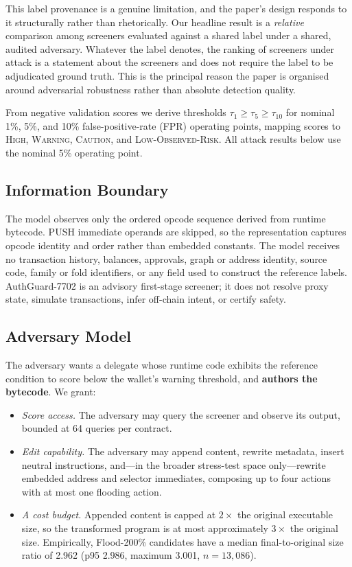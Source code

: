 \documentclass[conference]{IEEEtran}
\begin{document}
This label provenance is a genuine limitation, and the paper's design responds to it structurally rather than rhetorically. Our headline result is a \emph{relative} comparison among screeners evaluated against a shared label under a shared, audited adversary. Whatever the label denotes, the ranking of screeners under attack is a statement about the screeners and does not require the label to be adjudicated ground truth. This is the principal reason the paper is organised around adversarial robustness rather than absolute detection quality.

From negative validation scores we derive thresholds $\tau_1\geq\tau_5\geq\tau_{10}$ for nominal 1\%, 5\%, and 10\% false-positive-rate (FPR) operating points, mapping scores to \textsc{High}, \textsc{Warning}, \textsc{Caution}, and \textsc{Low-Observed-Risk}. All attack results below use the nominal 5\% operating point.

\subsection{Information Boundary}

The model observes only the ordered opcode sequence derived from runtime bytecode. PUSH immediate operands are skipped, so the representation captures opcode identity and order rather than embedded constants. The model receives no transaction history, balances, approvals, graph or address identity, source code, family or fold identifiers, or any field used to construct the reference labels. AuthGuard-7702 is an advisory first-stage screener; it does not resolve proxy state, simulate transactions, infer off-chain intent, or certify safety.

\subsection{Adversary Model}

The adversary wants a delegate whose runtime code exhibits the reference condition to score below the wallet's warning threshold, and \textbf{authors the bytecode}. We grant:

\begin{itemize}
\item \emph{Score access.} The adversary may query the screener and observe its output, bounded at 64 queries per contract.
\item \emph{Edit capability.} The adversary may append content, rewrite metadata, insert neutral instructions, and---in the broader stress-test space only---rewrite embedded address and selector immediates, composing up to four actions with at most one flooding action.
\item \emph{A cost budget.} Appended content is capped at $2\times$ the original executable size, so the transformed program is at most approximately $3\times$ the original size. Empirically, Flood-200\% candidates have a median final-to-original size ratio of 2.962 (p95 2.986, maximum 3.001, $n=13{,}086$).
\end{itemize}
\end{document}

